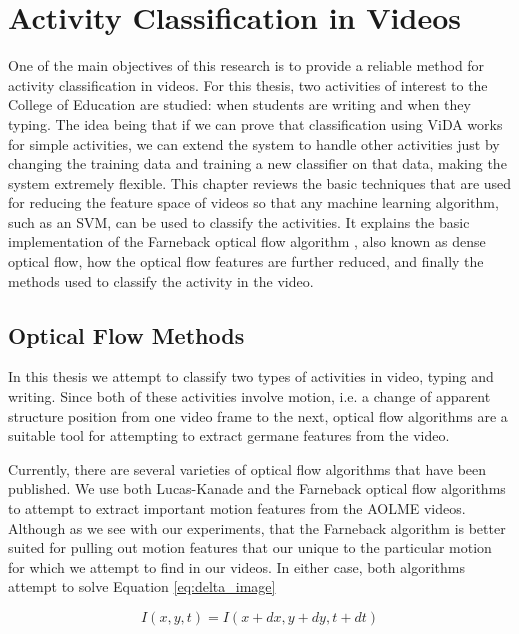 \chapter{Activity Classification in Videos}
One of the main objectives of this research is to provide a reliable method for
activity classification in videos. For this thesis, two activities of interest
to the College of Education are studied: when students are writing and when they
typing. The idea being that if we can prove that classification using ViDA works
for simple activities, we can extend the system to handle other activities just
by changing the training data and training a new classifier on that data, making
the system extremely flexible. This chapter reviews the basic techniques that
are used for reducing the feature space of videos so that any machine learning
algorithm, such as an SVM, can be used to classify the activities. It explains
the basic implementation of the Farneback optical flow algorithm
\cite{farneback2003two}, also known as dense optical flow, how the optical flow
features are further reduced, and finally the methods used to classify the
activity in the video.

\section{\label{section:optical_flow_methods}Optical Flow Methods}
In this thesis we attempt to classify two types of activities in video,  typing
and writing. Since both of these activities involve motion, i.e. a change of
apparent structure position from one video frame to the next, optical flow
algorithms  are a suitable tool for attempting to extract germane features from
the video.

Currently, there are several varieties of optical flow algorithms that have been
published. We use both Lucas-Kanade \cite{lucas1981iterative} and the Farneback
\cite{farneback2003two}  optical flow algorithms to attempt to extract
important motion features from the AOLME videos. Although as we see with our
experiments, that the Farneback algorithm is better suited for pulling out
motion features that our unique to the particular motion for which we attempt
to find in our videos. In either case, both algorithms attempt to solve
Equation \ref{eq:delta_image}

\begin{equation}
I(x,y,t) = I(x+dx, y+dy, t+dt)
\label{eq:delta_image}
\end{equation}

